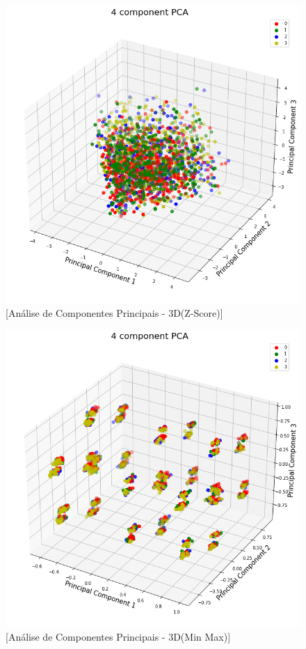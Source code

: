 \documentclass[conference]{IEEEtran}
\begin{document}
\begin{figure}[htbp]
    \centerline{\includegraphics[scale=0.4]{xzscore-pca-3d.png}}
    \caption{[Análise de Componentes Principais - 3D(Z-Score)]}
    \label{fig:imagem3}
\end{figure}

\begin{figure}[htbp]
    \centerline{\includegraphics[scale=0.4]{min_max-pca-3d.png}}
    \caption{[Análise de Componentes Principais - 3D(Min Max)]}
    \label{fig:imagem3}
\end{figure}
\end{document}
